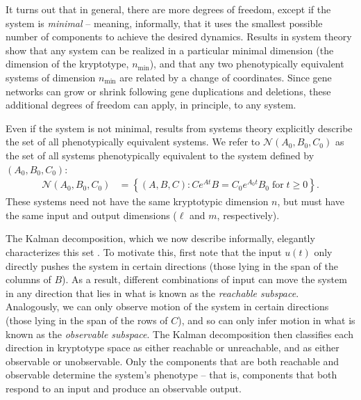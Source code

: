 \documentclass{article}
\newcommand{\1}{\mathbbm{1}}
\newcommand{\Sys}{\mathcal{S}}
\newcommand{\allS}{\mathcal{N}}
\begin{document}
It turns out that in general, there are more degrees of freedom,
except if the system is \emph{minimal} -- meaning, informally, that it uses the smallest possible number of components
to achieve the desired dynamics.
Results in system theory show that any system can be realized in a particular minimal dimension
(the dimension of the kryptotype, $n_\text{min}$),
and that any two phenotypically equivalent systems of dimension $n_\text{min}$ are related by a change of coordinates.
Since gene networks can grow or shrink following gene duplications and deletions, 
these additional degrees of freedom can apply, in principle, to any system.

Even if the system is not minimal, results from systems theory %
explicitly describe the set of all phenotypically equivalent systems.
We refer to $\allS(A_0,B_0,C_0)$ as the set of all systems phenotypically equivalent
to the system defined by $(A_0, B_0, C_0)$:
\begin{equation} \label{eqn:equivalence}
  \begin{aligned}
    \allS(A_0, B_0, C_0) 
      &= \left\{
        (A,B,C) : C e^{At} B = C_0 e^{A_0 t} B_0 \; \text{for}\; t \ge 0 
      \right\}  .
  \end{aligned}
\end{equation}
These systems need not have the same kryptotypic dimension $n$,
but must have the same input and output dimensions ($\ell$ and $m$, respectively).

The Kalman decomposition, which we now describe informally, elegantly characterizes this set
\citep{kalman1963mathematical,kalman1969topics,anderson1966equivalence}.
To motivate this, first note that the input $u(t)$ only directly pushes the system
in certain directions (those lying in the span of the columns of $B$).
As a result, different combinations of input can 
move the system in any direction that lies in what is known as the \emph{reachable subspace}.
Analogously, we can only observe motion of the system in certain directions
(those lying in the span of the rows of $C$),
and so can only infer motion in what is known as the \emph{observable subspace}.
The Kalman decomposition then classifies each direction in kryptotype space
as either reachable or unreachable, and as either observable or unobservable.
Only the components that are both reachable and observable determine the system's phenotype --
that is, components that both respond to an input and produce an observable output. 
\end{document}
